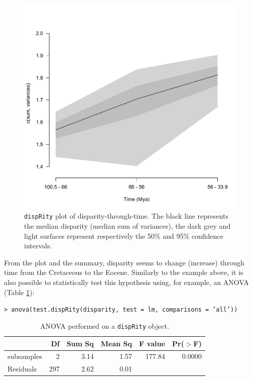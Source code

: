 \documentclass[12pt,letterpaper]{article}
\newcommand{\disp}{\texttt{dispRity} }
\begin{document}
\begin{figure}[!htbp]
\centering
   \includegraphics[width=1\textwidth]{plot_example_time.pdf} 
\caption{\disp plot of disparity-through-time. The black line represents the median disparity (median sum of variances), the dark grey and light surfaces represent respectively the 50\% and 95\% confidence intervals.}
\label{Fig:plot_time}
\end{figure}

From the plot and the summary, disparity seems to change (increase) through time from the Cretaceous to the Eocene.
Similarly to the example above, it is also possible to statistically test this hypothesis using, for example, an ANOVA (Table \ref{Tab:anova}): 

\noindent \texttt{> anova(test.dispRity(disparity, test = lm, comparisons = 'all'))}

\begin{table}[ht]
\centering
\begin{tabular}{lrrrrr}
  \hline
 & Df & Sum Sq & Mean Sq & F value & Pr($>$F) \\ 
  \hline
subsamples & 2 & 3.14 & 1.57 & 177.84 & 0.0000 \\ 
  Residuals & 297 & 2.62 & 0.01 &  &  \\ 
   \hline
\end{tabular}
\caption{ANOVA performed on a \disp object.}
\label{Tab:anova}
\end{table}
\end{document}
